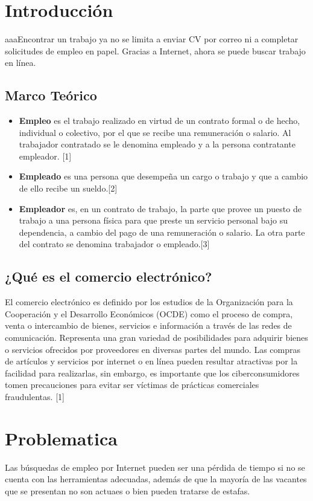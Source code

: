 \section{Introducción}
aaaEncontrar un trabajo ya no se limita a enviar CV por correo ni a completar solicitudes de empleo en papel. Gracias a Internet, ahora se puede buscar trabajo en línea. 

\subsection{Marco Teórico }
\begin{itemize}
\item \textbf{Empleo} es el trabajo realizado en virtud de un contrato formal o de hecho, individual o colectivo, por el que se recibe una remuneración o salario. Al trabajador contratado se le denomina empleado y a la persona contratante empleador. [1]
\item \textbf{Empleado} es una persona que desempeña un cargo o trabajo y que a cambio de ello recibe un sueldo.[2]
\item \textbf{Empleador} es, en un contrato de trabajo, la parte que provee un puesto de trabajo a una persona física para que preste un servicio personal bajo su dependencia, a cambio del pago de una remuneración o salario. La otra parte del contrato se denomina trabajador o empleado.[3]
\end{itemize}


\subsection{¿Qué es el comercio electrónico?}
El comercio electrónico es definido por los estudios de la Organización para la Cooperación y el Desarrollo Económicos (OCDE) como el proceso de compra, venta o intercambio de bienes, servicios e información a través de las redes de comunicación. Representa una gran variedad de posibilidades para adquirir bienes o servicios ofrecidos por proveedores en diversas partes del mundo. Las compras de artículos y servicios por internet o en línea pueden resultar atractivas por la facilidad para realizarlas, sin embargo, es importante que los ciberconsumidores tomen precauciones para evitar ser víctimas de prácticas comerciales fraudulentas. [1]




\newpage
\section{Problematica}
Las búsquedas de empleo por Internet pueden ser una pérdida de tiempo si no se cuenta con las herramientas adecuadas, además de que la mayoría de las vacantes que se presentan no son actuaes o bien pueden tratarse de estafas.


